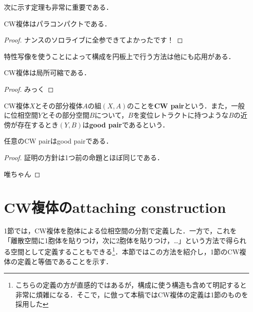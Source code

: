 \documentclass[uplatex]{jsarticle}
\begin{document}
次に示す定理も非常に重要である．

\begin{theorem}
  CW複体はパラコンパクトである．
\end{theorem}

\begin{proof}
  ナンスのソロライブに全参できてよかったです！
\end{proof}

特性写像を使うことによって構成を円板上で行う方法は他にも応用がある．

\begin{proposition}
  CW複体は局所可縮である．
\end{proposition}

\begin{proof}
  みっく
\end{proof}

CW複体$X$とその部分複体$A$の組$(X,A)$のことを\textbf{CW pair}という．また，一般に位相空間$Y$とその部分空間$B$について，$B$を変位レトラクトに持つような$B$の近傍が存在するとき$(Y,B)$は\textbf{good pair}であるという．

\begin{proposition}
  任意のCW pairはgood pairである．
\end{proposition}

\begin{proof}
  証明の方針は1つ前の命題とほぼ同じである．

  唯ちゃん
\end{proof}

\section{CW複体のattaching construction}

1節では，CW複体を胞体による位相空間の分割で定義した．一方で，これを「離散空間に1胞体を貼りつけ，次に2胞体を貼りつけ，\dots」という方法で得られる空間として定義することもできる\footnote{こちらの定義の方が直感的ではあるが，構成に使う構造も含めて明記すると非常に煩雑になる．そこで，\cite{LeeSmooth}に倣って本稿ではCW複体の定義は1節のものを採用した}．本節ではこの方法を紹介し，1節のCW複体の定義と等価であることを示す．
\end{document}
